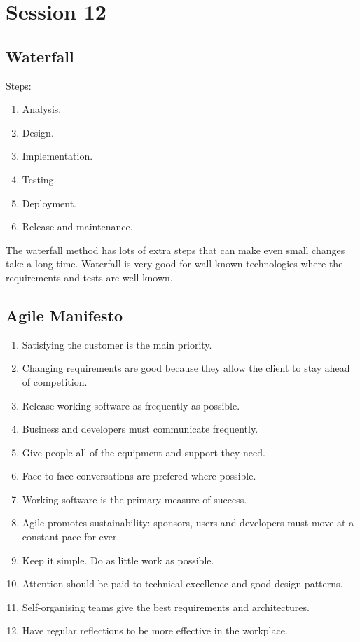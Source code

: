 \section{Session 12}\label{sec:session_12}

\subsection{Waterfall}\label{sub:waterfall}

Steps:
\begin{enumerate}
    \item Analysis.
    \item Design.
    \item Implementation.
    \item Testing.
    \item Deployment.
    \item Release and maintenance.
\end{enumerate}

\noindent
The waterfall method has lots of extra steps that can make even small changes take a long time.
Waterfall is very good for wall known technologies where the requirements and tests are well known.

\subsection{Agile Manifesto}\label{sub:agile_manifesto}

\begin{enumerate}
    \item Satisfying the customer is the main priority.
    \item Changing requirements are good because they allow the client to stay ahead of competition.
    \item Release working software as frequently as possible.
    \item Business and developers must communicate frequently.
    \item Give people all of the equipment and support they need.
    \item Face-to-face conversations are prefered where possible.
    \item Working software is the primary measure of success.
    \item Agile promotes sustainability: sponsors, users and developers must move at a constant pace for ever.
    \item Keep it simple. Do as little work as possible.
    \item Attention should be paid to technical excellence and good design patterns.
    \item Self-organising teams give the best requirements and architectures.
    \item Have regular reflections to be more effective in the workplace.
\end{enumerate}


